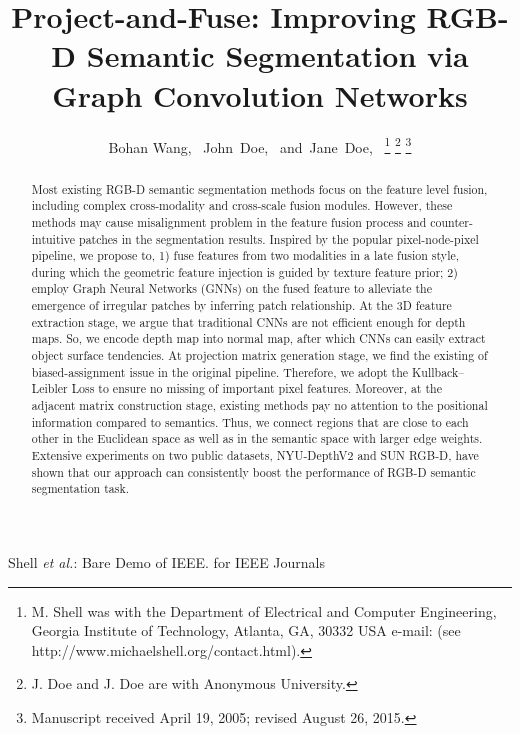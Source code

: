 ﻿\documentclass[journal]{IEEEtran}
\begin{document}


\title{Project-and-Fuse: Improving RGB-D Semantic Segmentation via Graph Convolution Networks}

\author{Bohan Wang,~
        John~Doe,~
        and~Jane~Doe,~%
\thanks{M. Shell was with the Department
of Electrical and Computer Engineering, Georgia Institute of Technology, Atlanta,
GA, 30332 USA e-mail: (see http://www.michaelshell.org/contact.html).}%
\thanks{J. Doe and J. Doe are with Anonymous University.}%
\thanks{Manuscript received April 19, 2005; revised August 26, 2015.}}

%
{Shell \MakeLowercase{\textit{et al.}}: Bare Demo of IEEE. for IEEE Journals}

\maketitle

\begin{abstract}
    Most existing RGB-D semantic segmentation methods focus on the feature level fusion, including complex cross-modality and cross-scale fusion modules. However, these methods may cause misalignment problem in the feature fusion process and counter-intuitive patches in the segmentation results. Inspired by the popular pixel-node-pixel pipeline, we propose to, 1) fuse features from two modalities in a late fusion style, during which the geometric feature injection is guided by texture feature prior; 2) employ Graph Neural Networks (GNNs) on the fused feature to alleviate the emergence of irregular patches by inferring patch relationship. At the 3D feature extraction stage, we argue that traditional CNNs are not efficient enough for depth maps. So, we encode depth map into normal map, after which CNNs can easily extract object surface tendencies. At projection matrix generation stage, we find the existing of biased-assignment issue in the original pipeline. Therefore, we adopt the Kullback–Leibler Loss to ensure no missing of important pixel features. Moreover, at the adjacent matrix construction stage, existing methods pay no attention to the positional information compared to semantics. Thus, we connect regions that are close to each other in the Euclidean space as well as in the semantic space with larger edge weights.
    Extensive experiments on two public datasets, NYU-DepthV2 and SUN RGB-D, have shown that our approach can consistently boost the performance of RGB-D semantic segmentation task.
    \end{abstract}
\end{document}
